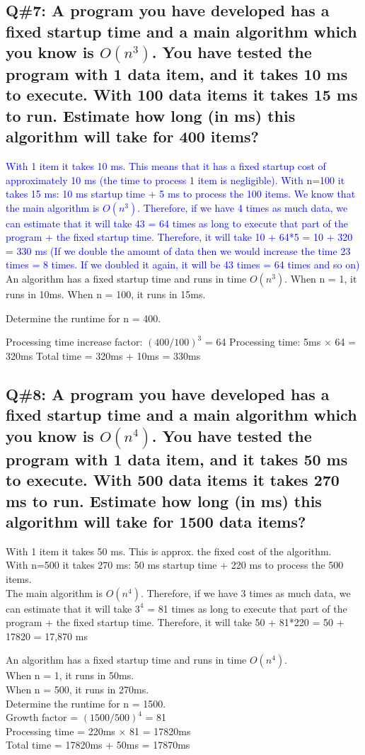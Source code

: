 \subsection*{Q\#7: A program you have developed has a fixed startup time and a main algorithm which you know is
\(O(n^3)\). You have tested the program with 1 data item, and it takes 10 ms to execute. With 100 data items
it takes 15 ms to run. Estimate how long (in ms) this algorithm will take for 400 items?}
\textcolor{blue}{
With 1 item it takes 10 ms. This means that it has a fixed startup cost of approximately 10 ms
(the time to process 1 item is negligible).
With n=100 it takes 15 ms: 10 ms startup time + 5 ms to process the 100 items.
We know that the main algorithm is \(O(n^3)\). Therefore, if we have 4 times as much data, we can estimate
that it will take 43 = 64 times as long to execute that part of the program + the fixed startup time.
Therefore, it will take 10 + 64*5 = 10 + 320 = 330 ms
(If we double the amount of data then we would increase the time 23 times = 8 times. If we doubled it
again, it will be 43 times = 64 times and so on)
}
An algorithm has a fixed startup time and runs in time \(O(n^3)\).  
When n = 1, it runs in 10ms.  
When n = 100, it runs in 15ms.  

Determine the runtime for n = 400.

Processing time increase factor: \((400/100)^3\) = 64  
Processing time: 5ms × 64 = 320ms  
Total time = 320ms + 10ms = 330ms

\subsection*{Q\#8: A program you have developed has a fixed startup time and a main algorithm which you know is
\(O(n^4)\). You have tested the program with 1 data item, and it takes 50 ms to execute. With 500 data items
it takes 270 ms to run. Estimate how long (in ms) this algorithm will take for 1500 data items?}

With 1 item it takes 50 ms. This is approx. the fixed cost of the algorithm.\\
With n=500 it takes 270 ms: 50 ms startup time + 220 ms to process the 500 items. \\
The main algorithm is \(O(n^4)\). Therefore, if we have 3 times as much data, we can estimate that it will take \(3^4\) = 81 times as long to execute that part of the program + the fixed startup time.
Therefore, it will take 50 + 81*220 = 50 + 17820 = 17,870 ms

An algorithm has a fixed startup time and runs in time \(O(n^4)\). \\ 
When n = 1, it runs in 50ms. \\ 
When n = 500, it runs in 270ms. \\  
Determine the runtime for n = 1500. \\
Growth factor = \((1500 / 500)^4\) = 81 \\ 
Processing time = 220ms × 81 = 17820ms \\ 
Total time = 17820ms + 50ms = 17870ms